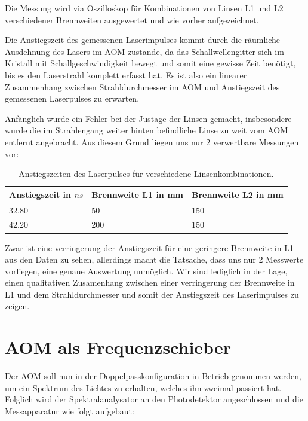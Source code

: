 \documentclass[bigchapter,colorback,accentcolor=tud4b,linedtoc,11pt]{tudreport}
\begin{document}
Die Messung wird via Oszilloskop für Kombinationen von Linsen L1 und L2 verschiedener Brennweiten ausgewertet und wie vorher aufgezeichnet.

Die Anstiegszeit des gemessenen Laserimpulses kommt durch die räumliche Ausdehnung des Lasers im AOM zustande, da das Schallwellengitter sich im Kristall mit Schallgeschwindigkeit bewegt und somit eine gewisse Zeit benötigt, bis es den Laserstrahl komplett erfasst hat. Es ist also ein linearer Zusammenhang zwischen Strahldurchmesser im AOM und Anstiegszeit des gemessenen Laserpulses zu erwarten.

Anfänglich wurde ein Fehler bei der Justage der Linsen gemacht, insbesondere wurde die im Strahlengang weiter hinten befindliche Linse zu weit vom AOM entfernt angebracht. Aus diesem Grund liegen uns nur 2 verwertbare Messungen vor:

\begin{table}[H]
  \begin{center}
    \begin{tabular}{|p{5cm}|p{4cm}|p{4.5cm}|}
      \hline
          Anstiegszeit in $ns$ & Brennweite L1 in mm & Brennweite L2 in mm \\ \hline
          32.80                & 50                  & 150                 \\ \hline
          42.20                & 200                 & 150                 \\ \hline
    \end{tabular}
  \end{center}
  \caption{Anstiegszeiten des Laserpulses für verschiedene Linsenkombinationen. }
\end{table}
\FloatBarrier

Zwar ist eine verringerung der Anstiegszeit für eine geringere Brennweite in L1 aus den Daten zu sehen, allerdings macht die Tatsache, dass uns nur 2 Messwerte vorliegen, eine genaue Auswertung unmöglich. Wir sind lediglich in der Lage, einen qualitativen Zusamenhang zwischen einer verringerung der Brennweite in L1 und dem Strahldurchmesser und somit der Anstiegszeit des Laserimpulses zu zeigen.

\section{AOM als Frequenzschieber}

Der AOM soll nun in der Doppelpasskonfiguration in Betrieb genommen werden, um ein Spektrum des Lichtes zu erhalten, welches ihn zweimal passiert hat. Folglich wird der Spektralanalysator an den Photodetektor angeschlossen und die Messapparatur wie folgt aufgebaut: 
\end{document}
